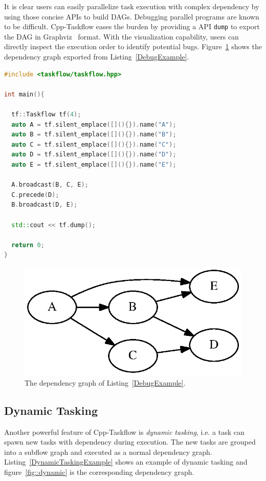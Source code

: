 \documentclass[sigconf]{acmart}
\def\codeinline{\lstinline[basicstyle=\normalsize\color{darkgray},language=C++]}
\begin{document}
It is clear users can easily parallelize task execution with complex dependency 
by using those concise APIs to build DAGs. Debugging parallel programs are known 
to be difficult. Cpp-Taskflow eases the burden by providing a API
\codeinline{dump} to export the DAG in Graphviz~\cite{graphviz} format. 
With the visualization capability, users can directly inspect the execution order 
to identify potential bugs.  Figure~\ref{fig::debug}
shows the dependency graph exported from Listing~\ref{DebugExample}.


\begin{lstlisting}[language=C++,label=DebugExample,caption={A debugging example.}]
#include <taskflow/taskflow.hpp>  

int main(){
  
  tf::Taskflow tf(4);  
  auto A = tf.silent_emplace([](){}).name("A");
  auto B = tf.silent_emplace([](){}).name("B");
  auto C = tf.silent_emplace([](){}).name("C");
  auto D = tf.silent_emplace([](){}).name("D");
  auto E = tf.silent_emplace([](){}).name("E");
  
  A.broadcast(B, C, E); 
  C.precede(D);
  B.broadcast(D, E); 
  
  std::cout << tf.dump();

  return 0;
}
\end{lstlisting} 

\begin{figure}[htb]
 \centering
 \includegraphics[width=.6\columnwidth]{Fig/debug.eps}
  \caption{
    The dependency graph of Listing~\ref{DebugExample}.
  }
 \label{fig::debug}
\end{figure}


\subsection{Dynamic Tasking}
Another powerful feature of Cpp-Taskflow is \emph{dynamic tasking}, i.e. a task
can spawn new tasks with dependency during execution. The new tasks are grouped
into a subflow graph and executed as a normal dependency graph.
Listing~\ref{DynamicTaskingExample} shows an example of dynamic tasking and
figure~\ref{fig::dynamic} is the corresponding dependency graph.
\end{document}
